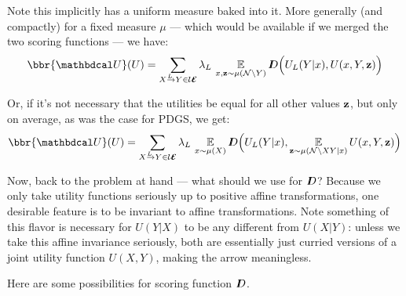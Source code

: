 \documentclass{article}
\newcommand\UEd{\mathcal U\!\!\Ed}
\begin{document}
    Note this implicitly has a uniform measure baked into it. More generally (and compactly) for a fixed measure $\mu$ --- which would be available if we merged the two scoring functions --- we have:
    \begin{equation}
        \bbr{\dg U}(U) =
             \sum_{\ed LXY \in \UEd} \lambda_L\, \Ex_{\substack{x,\mat z \sim \mu(\N \setminus Y)}}
             \thickD\Big( U_L(Y | x),  U(x,Y, \mat z) \Big)
    \end{equation}
    
    Or, if it's not necessary that the utilities be equal for all other values $\mathbf{z}$, but only on average, as was the case for PDGS, we get:
    \begin{equation}
        \bbr{\dg U}(U) =
             \sum_{\ed LXY \in \UEd} \lambda_L\, \Ex_{x \sim \mu(X)}
             \thickD\Big( U_L(Y | x),  \Ex_{\mat z \sim \mu(\N\setminus XY|x)}U(x,Y, \mat z) \Big)
    \end{equation}

     
    Now, back to the problem at hand --- what should we use for $I\mkern-8muD$? Because we only take utility functions seriously up to positive affine transformations, one desirable feature is to be invariant to affine transformations.
    Note something of this flavor is necessary for $U(Y|X)$ to be any different from $U(X|Y)$: unless we take this affine invariance seriously, both are essentially just curried versions of a joint utility function $U(X,Y)$, making the arrow meaningless.
    
    Here are some possibilities for scoring function $I\mkern-8muD$.
    
\end{document}
